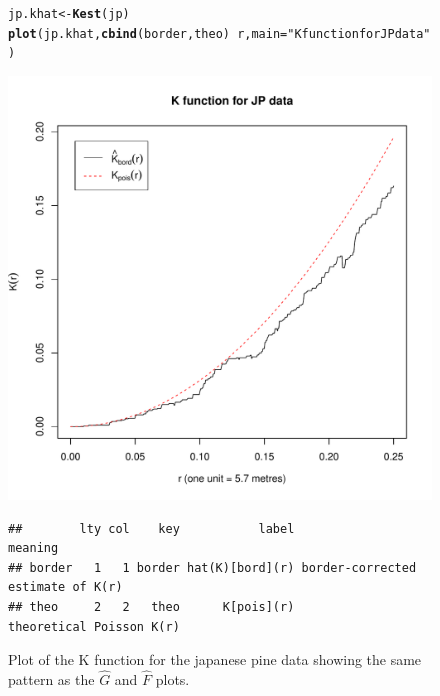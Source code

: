 \documentclass{article}\usepackage[]{graphicx}\usepackage[]{color}
\makeatletter
\def\maxwidth{ %
  \ifdim\Gin@nat@width>\linewidth
    \linewidth
  \else
    \Gin@nat@width
  \fi
}
\newcommand{\hlstr}[1]{\textcolor[rgb]{0.192,0.494,0.8}{#1}}%
\newcommand{\hlopt}[1]{\textcolor[rgb]{0,0,0}{#1}}%
\newcommand{\hlstd}[1]{\textcolor[rgb]{0.345,0.345,0.345}{#1}}%
\newcommand{\hlkwb}[1]{\textcolor[rgb]{0.69,0.353,0.396}{#1}}%
\newcommand{\hlkwc}[1]{\textcolor[rgb]{0.333,0.667,0.333}{#1}}%
\newcommand{\hlkwd}[1]{\textcolor[rgb]{0.737,0.353,0.396}{\textbf{#1}}}%
\newenvironment{kframe}{%
 \def\at@end@of@kframe{}%
 \ifinner\ifhmode%
  \def\at@end@of@kframe{\end{minipage}}%
  \begin{minipage}{\columnwidth}%
 \fi\fi%
 \def\FrameCommand##1{\hskip\@totalleftmargin \hskip-\fboxsep
 \colorbox{shadecolor}{##1}\hskip-\fboxsep
     \hskip-\linewidth \hskip-\@totalleftmargin \hskip\columnwidth}%
 \MakeFramed {\advance\hsize-\width
   \@totalleftmargin\z@ \linewidth\hsize
   \@setminipage}}%
 {\par\unskip\endMakeFramed%
 \at@end@of@kframe}
\newenvironment{knitrout}{}{} %
\makeatother
\begin{document}
\begin{figure}
\begin{knitrout}
\color{fgcolor}\begin{kframe}
\begin{alltt}
\hlstd{jp.khat}\hlkwb{<-}\hlkwd{Kest}\hlstd{(jp)}
\hlkwd{plot}\hlstd{(jp.khat,} \hlkwd{cbind}\hlstd{(border, theo)}\hlopt{~}\hlstd{r,} \hlkwc{main}\hlstd{=}\hlstr{"K function for JP data"}\hlstd{)}
\end{alltt}
\end{kframe}
\includegraphics[width=\maxwidth]{figure/Kest} 
\begin{kframe}\begin{verbatim}
##        lty col    key           label                           meaning
## border   1   1 border hat(K)[bord](r) border-corrected estimate of K(r)
## theo     2   2   theo      K[pois](r)          theoretical Poisson K(r)
\end{verbatim}
\end{kframe}
\end{knitrout}
\caption{Plot of the K function for the japanese pine data showing the same pattern as the $\hat{G}$ and $\hat{F}$ plots.}
\label{kest}
\end{figure}
\end{document}

